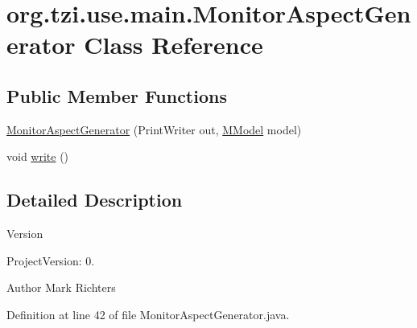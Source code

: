 \hypertarget{classorg_1_1tzi_1_1use_1_1main_1_1_monitor_aspect_generator}{\section{org.\-tzi.\-use.\-main.\-Monitor\-Aspect\-Generator Class Reference}
\label{classorg_1_1tzi_1_1use_1_1main_1_1_monitor_aspect_generator}
}
\subsection*{Public Member Functions}
\begin{DoxyCompactItemize}
\item 
\hyperlink{classorg_1_1tzi_1_1use_1_1main_1_1_monitor_aspect_generator_ab04b9c9e8d65305077ac4327f6442ebe}{Monitor\-Aspect\-Generator} (Print\-Writer out, \hyperlink{classorg_1_1tzi_1_1use_1_1uml_1_1mm_1_1_m_model}{M\-Model} model)
\item 
void \hyperlink{classorg_1_1tzi_1_1use_1_1main_1_1_monitor_aspect_generator_a4cbc7de38a8547e3f429532e03a9a479}{write} ()
\end{DoxyCompactItemize}


\subsection{Detailed Description}
\begin{DoxyVersion}{Version}

\end{DoxyVersion}
\begin{DoxyParagraph}{Project\-Version\-:}
0. 
\end{DoxyParagraph}
\begin{DoxyAuthor}{Author}
Mark Richters 
\end{DoxyAuthor}


Definition at line 42 of file Monitor\-Aspect\-Generator.\-java.



